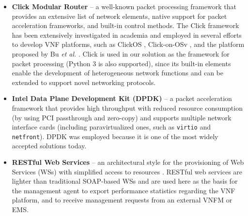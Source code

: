 \begin{itemize}
    \item \textbf{Click Modular Router} -- a well-known packet processing framework that provides an extensive list of network elements, native support for packet acceleration frameworks, and built-in control methods. The Click framework has been extensively investigated in academia and employed in several efforts to develop VNF platforms, such as ClickOS \cite{Martins-2014}, Click-on-OSv \cite{Marcuzzo-2018}, and the platform proposed by Bu \textit{et al.} \cite{Bu-2018}. Click is used in our solution as the framework for packet processing (Python 3 is also supported), since its built-in elements enable the development of heterogeneous network functions and can be extended to support novel networking protocols.


      \item \textbf{Intel Data Plane Development Kit (DPDK)} -- a packet acceleration framework that provides high throughput with reduced resource consumption (by using PCI passthrough and zero-copy) and supports multiple network interface cards (including paravirtualized ones, such as \texttt{virtio} and \texttt{netfront}). DPDK was employed because it is one of the most widely accepted solutions today.


      \item \textbf{RESTful Web Services} -- an architectural style for the provisioning of Web Services (WSs) with simplified access to resources \cite{Roman-2005}. RESTful web services are lighter than traditional SOAP-based WSs and are used here as the basis for the management agent to export performance statistics regarding the VNF platform, and to receive management requests from an external VNFM or EMS.


\end{itemize}
